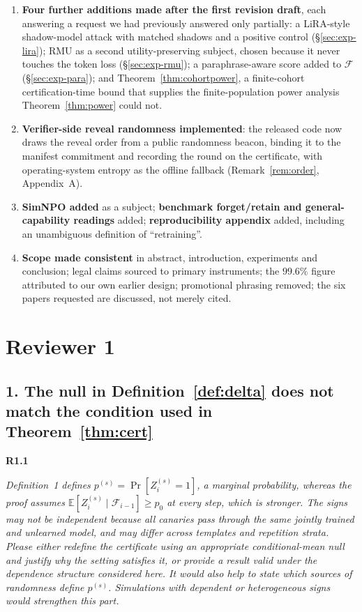 \documentclass[11pt,a4paper]{article}
\newcommand{\F}{\mathcal{F}}
\newenvironment{point}[1]{%
  \par\medskip\noindent\textbf{\color{rcol}#1}\par\nopagebreak\smallskip\begingroup
  \color{rcol}\itshape}{\endgroup\par}
\begin{document}
\begin{enumerate}[leftmargin=1.4em,itemsep=1pt,topsep=2pt]
min-$k\%$ on identical runs (\S\ref{sec:exp-descriptive}); attacks from \emph{outside} the declared class
(\S\ref{sec:exp-outclass}); canary detectability, with the negative result and the entropy-dilution
design rule that follows from it (\S\ref{sec:exp-detect}).
\item \textbf{Four further additions made after the first revision draft}, each
answering a request we had previously answered only partially: a LiRA-style
shadow-model attack with matched shadows and a positive control (\S\ref{sec:exp-lira}); RMU as a
second utility-preserving subject, chosen because it never touches the token loss
(\S\ref{sec:exp-rmu}); a paraphrase-aware score added to $\F$ (\S\ref{sec:exp-para}); and
Theorem~\ref{thm:cohortpower}, a finite-cohort certification-time bound that supplies the
finite-population power analysis Theorem~\ref{thm:power} could not.
\item \textbf{Verifier-side reveal randomness implemented}: the released code now
draws the reveal order from a public randomness beacon, binding it to the manifest
commitment and recording the round on the certificate, with operating-system entropy
as the offline fallback (Remark~\ref{rem:order}, Appendix~A).
\item \textbf{SimNPO added} as a subject; \textbf{benchmark forget/retain and
general-capability readings} added; \textbf{reproducibility appendix} added, including
an unambiguous definition of ``retraining''.
\item \textbf{Scope made consistent} in abstract, introduction, experiments and
conclusion; legal claims sourced to primary instruments; the $99.6\%$ figure attributed
to our own earlier design; promotional phrasing removed; the six papers requested are
discussed, not merely cited.
\end{enumerate}

\clearpage
\section*{Reviewer 1}

\subsection*{1. The null in Definition~\ref{def:delta} does not match the condition used in Theorem~\ref{thm:cert}}

\begin{point}{R1.1}
Definition~1 defines $p^{(s)} = \Pr[Z_i^{(s)}=1]$, a marginal probability, whereas the
proof assumes $\mathbb{E}[Z_i^{(s)}\mid\mathcal{F}_{i-1}] \ge p_0$ at every step, which
is stronger. The signs may not be independent because all canaries pass through the
same jointly trained and unlearned model, and may differ across templates and
repetition strata. Please either redefine the certificate using an appropriate
conditional-mean null and justify why the setting satisfies it, or provide a result
valid under the dependence structure considered here. It would also help to state which
sources of randomness define $p^{(s)}$. Simulations with dependent or heterogeneous
signs would strengthen this part.
\end{point}
\end{document}
